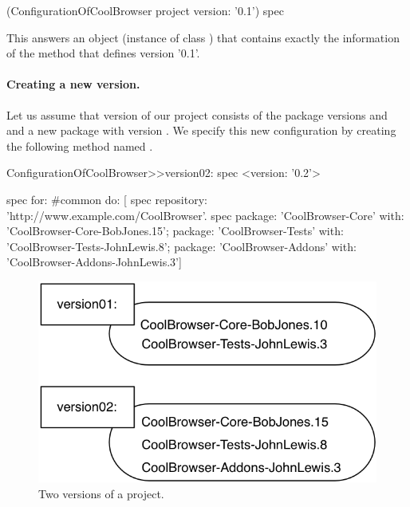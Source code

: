 \documentclass[a4paper,10pt,twoside]{book}
\begin{document}
\begin{code}{}
	(ConfigurationOfCoolBrowser project version: '0.1') spec
\end{code}

This  answers an object (instance of class ) that contains exactly the information of the method that defines version '0.1'.





\paragraph{Creating a new version.}
Let us assume that version  of our project consists of the package versions \mbox{} and \mbox{} and a new package  with version . We specify this new configuration by creating the following method named .

\begin{code}{}
ConfigurationOfCoolBrowser>>version02: spec 
      <version: '0.2'>
       
      spec for: #common do: [
            spec repository: 'http://www.example.com/CoolBrowser'.
            spec 
                  package: 'CoolBrowser-Core' with: 'CoolBrowser-Core-BobJones.15';
                  package: 'CoolBrowser-Tests' with: 'CoolBrowser-Tests-JohnLewis.8';
                  package: 'CoolBrowser-Addons' with: 'CoolBrowser-Addons-JohnLewis.3']
\end{code}
 
\begin{figure}
\begin{center}
\includegraphics[width=0.6\linewidth]{version02}
\caption{Two versions of a project.}
\end{center}
\end{figure} 
 
\end{document}

